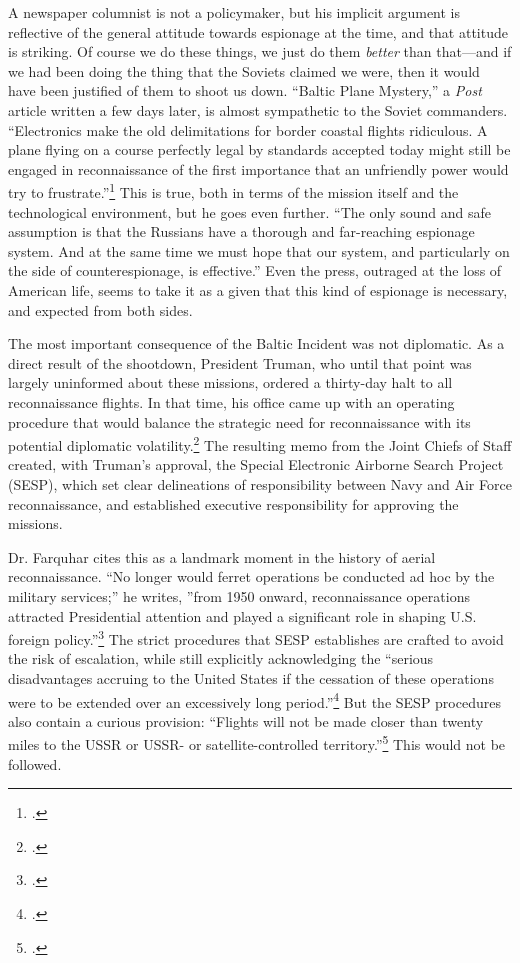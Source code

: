 \documentclass{report}
\begin{document}
\begin{refsegment}
A newspaper columnist is not a policymaker, but his implicit argument is reflective of the general attitude towards espionage at the time, and that attitude is striking. Of course we do these things, we just do them \emph{better} than that---and if we had been doing the thing that the Soviets claimed we were, then it would have been justified of them to shoot us down. ``Baltic Plane Mystery,'' a \emph{Post} article written a few days later, is almost sympathetic to the Soviet commanders. ``Electronics make the old delimitations for border coastal flights ridiculous. A plane flying on a course perfectly legal by standards accepted today might still be engaged in reconnaissance of the first importance that an unfriendly power would try to frustrate.''\footcite{childs_baltic_1950} This is true, both in terms of the mission itself and the technological environment, but he goes even further. ``The only sound and safe assumption is that the Russians have a thorough and far-reaching espionage system. And at the same time we must hope that our system, and particularly on the side of counterespionage, is effective.'' Even the press, outraged at the loss of American life, seems to take it as a given that this kind of espionage is necessary, and expected from both sides.

The most important consequence of the Baltic Incident was not diplomatic. As a direct result of the shootdown, President Truman, who until that point was largely uninformed about these missions, ordered a thirty-day halt to all reconnaissance flights. In that time, his office came up with an operating procedure that would balance the strategic need for reconnaissance with its potential diplomatic volatility.\footcite[p.~41]{farquhar_aerial_2015} The resulting memo from the Joint Chiefs of Staff created, with Truman's approval, the Special Electronic Airborne Search Project (SESP), which set clear delineations of responsibility between Navy and Air Force reconnaissance, and established executive responsibility for approving the missions.

Dr. Farquhar cites this as a landmark moment in the history of aerial reconnaissance. ``No longer would ferret operations be conducted ad hoc by the military services;'' he writes, ''from 1950 onward, reconnaissance operations attracted Presidential attention and played a significant role in shaping U.S. foreign policy.''\footcite[p.~42]{farquhar_aerial_2015} The strict procedures that SESP establishes are crafted to avoid the risk of escalation, while still explicitly acknowledging the ``serious disadvantages accruing to the United States if the cessation of these operations were to be extended over an excessively long period.''\footcite{bradley_memorandum_1950} But the SESP procedures also contain a curious provision: ``Flights will not be made closer than twenty miles to the USSR or USSR- or satellite-controlled territory.''\footcite{bradley_memorandum_1950} This would not be followed.


\end{refsegment}
\end{document}

